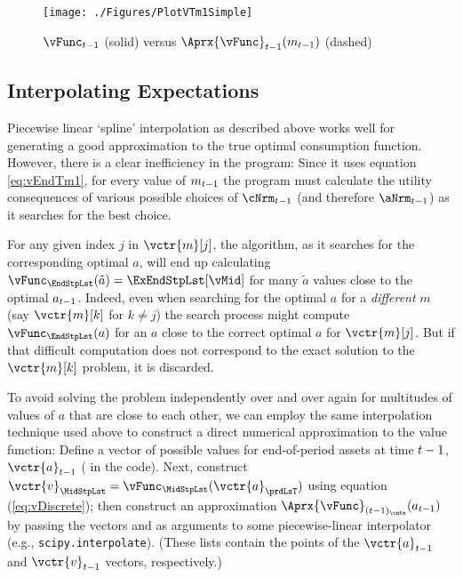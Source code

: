 \documentclass[SolvingMicroDSOPs]{subfiles}
\begin{document}
\hypertarget{PlotvTm1Simple}{}
\begin{figure}
  \centerline{\texttt{[image: ./Figures/PlotVTm1Simple]}}
  \caption{$\vFunc_{\prdT-1}$ (solid) versus $\Aprx{\vFunc}_{\prdT-1}({m}_{\prdT-1})$ (dashed)}
  \label{fig:PlotVTm1Simple}
\end{figure}

\hypertarget{interpolating-expectations}{}
\subsection{Interpolating Expectations}


Piecewise linear `spline' interpolation as described above works well for generating a good approximation to the true optimal consumption function. However, there is a clear inefficiency in the program: Since it uses equation \eqref{eq:vEndTm1}, for every value of ${m}_{t-1}$ the program must calculate the utility consequences of various possible choices of $\cNrm_{\prdT-1}$ (and therefore $\aNrm_{\prdT-1}$) as it searches for the best choice.

For any given index $j$ in $\vctr{m}[j]$, the algorithm, as it searches for the corresponding optimal $a$, will end up  calculating $\vFunc_{\EndStpLst}(\tilde{a}) = \ExEndStpLst[\vMid]$ for many $\tilde{a}$ values close to the optimal ${a}_{t-1}$.  Indeed, even when searching for the optimal ${a}$ for a \emph{different} ${m}$ (say $\vctr{m}[k]$ for $k \neq j$) the search process might compute $\vFunc_{\EndStpLst}({a})$ for an ${a}$ close to the correct optimal ${a}$ for $\vctr{m}[j]$. But if that difficult computation does not correspond to the exact solution to the $\vctr{m}[k]$ problem, it is discarded.  

To avoid solving the problem independently over and over again for multitudes of values of ${a}$ that are close to each other, we can employ the same interpolation technique used above to construct a direct numerical approximation to the value function: Define a vector of possible values for end-of-period assets at time $t-1$, $\vctr{{a}}_{\prdT-1}$ ( in the code). Next, construct $\vctr{{v}}_{\MidStpLst} = \vFunc_{\MidStpLst}(\vctr{{a}}_{\prdLsT})$ using equation (\ref{eq:vDiscrete}); then construct an approximation $\Aprx{\vFunc}_{({\prdT-1})_\cntn}({a}_{\prdT-1})$ by passing the vectors {\aVec} and {\vVec} as arguments to some piecewise-linear interpolator (e.g., \texttt{scipy.interpolate}).  (These lists contain the points of the $\vctr{a}_{{\prdT-1}}$ and $\vctr{{v}}_{{\prdT-1}}$ vectors, respectively.)
\end{document}
